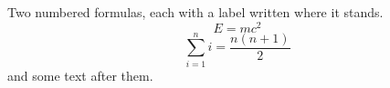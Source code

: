 \documentclass{article}
\begin{document}
Two numbered formulas, each with a label written where it stands.
\begin{equation}
  E = mc^2 \label{eq:energy}
\end{equation}
\begin{equation}
  \label{eq:sum} \sum_{i=1}^n i = \frac{n(n+1)}{2}
\end{equation}
and some text after them.
\end{document}
